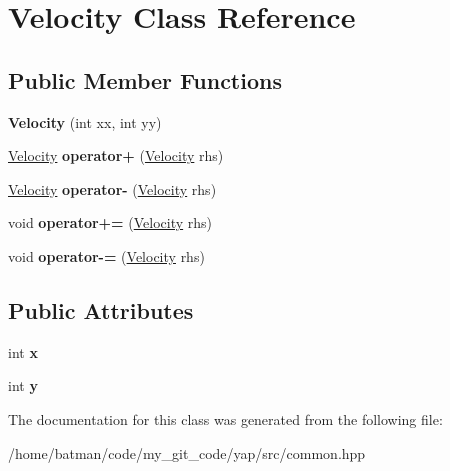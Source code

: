 \hypertarget{classVelocity}{}\section{Velocity Class Reference}
\label{classVelocity}
\subsection*{Public Member Functions}
\begin{DoxyCompactItemize}
\item 
\hypertarget{classVelocity_ad25d335f5ccd7c24fbe853abee443ff0}{}{\bfseries Velocity} (int xx, int yy)\label{classVelocity_ad25d335f5ccd7c24fbe853abee443ff0}

\item 
\hypertarget{classVelocity_aa16dd3e5db060cbfa0763942b75bb880}{}\hyperlink{classVelocity}{Velocity} {\bfseries operator+} (\hyperlink{classVelocity}{Velocity} rhs)\label{classVelocity_aa16dd3e5db060cbfa0763942b75bb880}

\item 
\hypertarget{classVelocity_a9ce7914dc2557b666127c241041b6354}{}\hyperlink{classVelocity}{Velocity} {\bfseries operator-\/} (\hyperlink{classVelocity}{Velocity} rhs)\label{classVelocity_a9ce7914dc2557b666127c241041b6354}

\item 
\hypertarget{classVelocity_ad2ebf7e97e9820609a6e6dd55e56cc1f}{}void {\bfseries operator+=} (\hyperlink{classVelocity}{Velocity} rhs)\label{classVelocity_ad2ebf7e97e9820609a6e6dd55e56cc1f}

\item 
\hypertarget{classVelocity_a1196064ccbe7f1faa584260dbab50982}{}void {\bfseries operator-\/=} (\hyperlink{classVelocity}{Velocity} rhs)\label{classVelocity_a1196064ccbe7f1faa584260dbab50982}

\end{DoxyCompactItemize}
\subsection*{Public Attributes}
\begin{DoxyCompactItemize}
\item 
\hypertarget{classVelocity_a1286d9d936730167034b2937f1c18b89}{}int {\bfseries x}\label{classVelocity_a1286d9d936730167034b2937f1c18b89}

\item 
\hypertarget{classVelocity_a4b1ae93762efafae20f9a5d8a769a9d4}{}int {\bfseries y}\label{classVelocity_a4b1ae93762efafae20f9a5d8a769a9d4}

\end{DoxyCompactItemize}


The documentation for this class was generated from the following file\+:\begin{DoxyCompactItemize}
\item 
/home/batman/code/my\+\_\+git\+\_\+code/yap/src/common.\+hpp\end{DoxyCompactItemize}

